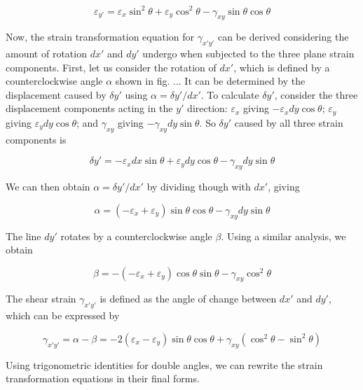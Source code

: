 \documentclass[
10pt,
a4paper,
openany,
svgnames,
]{book} %
\begin{document}
\begin{equation} \label{eqn: strain transformation in y unmod}
  \varepsilon_{y'} = \varepsilon_x \sin^2 \theta + \varepsilon_y \cos^2 \theta - \gamma_{xy} \sin \theta \cos \theta
\end{equation}

Now, the strain transformation equation for $\gamma_{x'y'}$ can be derived considering the amount of rotation $dx'$ and $dy'$ undergo when subjected to the three plane strain components. First, let us consider the rotation of $dx'$, which is defined by a counterclockwise angle $\alpha$ shown in fig. ... It can be determined by the displacement caused by $\delta y'$ using $
\alpha = \delta y' / dx'$. To calculate $\delta y'$, consider the three displacement components acting in the $y'$ direction: $\varepsilon_x$ giving $-\varepsilon_x dy \cos \theta$; $\varepsilon_y$ giving $\varepsilon_y dy \cos \theta$; and $\gamma_{xy}$ giving $-\gamma_{xy} dy \sin \theta$. So $\delta y'$ caused by all three strain components is

\begin{equation*}
  \delta y' = - \varepsilon_x dx \sin \theta + \varepsilon_y dy \cos \theta - \gamma_{xy} dy \sin \theta
\end{equation*}

We can then obtain $\alpha = \delta y' / dx'$ by dividing though with $dx'$, giving

\begin{equation}
  \alpha = \left(-\varepsilon_x + \varepsilon_y \right) \sin \theta \cos \theta - \gamma_{xy}dy \sin \theta
\end{equation}

The line $dy'$ rotates by a counterclockwise angle $\beta$. Using a similar analysis, we obtain

\begin{equation*}
  \beta = - \left( - \varepsilon_x + \varepsilon_y \right) \cos \theta \sin \theta - \gamma_{xy} \cos^2 \theta
\end{equation*}

The shear strain $\gamma_{x'y'}$ is defined as the angle of change between $dx'$ and $dy'$, which can be expressed by

\begin{equation}
  \gamma_{x'y'} = \alpha - \beta = -2 \left( \varepsilon_x - \varepsilon_y \right) \sin \theta \cos \theta + \gamma_{xy} ( \cos^2 \theta - \sin^2 \theta )
\end{equation}

Using trigonometric identities for double angles, we can rewrite the strain transformation equations in their final forms.
\end{document}
